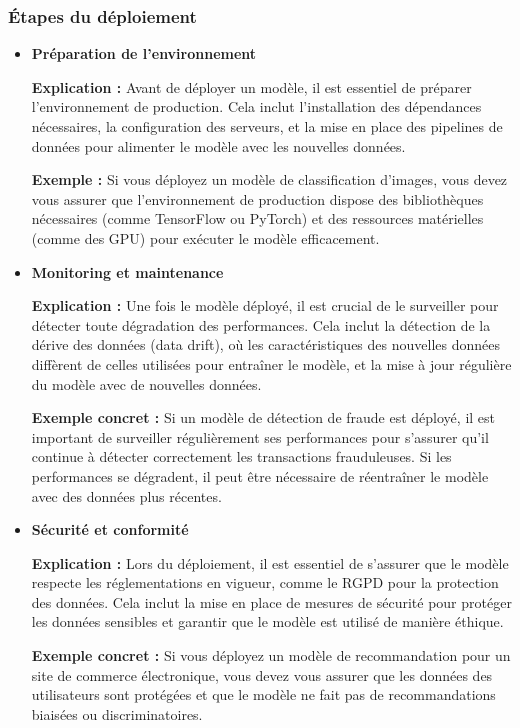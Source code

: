 \documentclass[10pt,a4paper]{article}
\begin{document}
\subsubsection*{Étapes du déploiement}

\begin{itemize}
    \item \textbf{Préparation de l'environnement}

    \textbf{Explication :}
    Avant de déployer un modèle, il est essentiel de préparer l'environnement de production. Cela inclut l'installation des dépendances nécessaires, la configuration des serveurs, et la mise en place des pipelines de données pour alimenter le modèle avec les nouvelles données.

    \textbf{Exemple :}
    Si vous déployez un modèle de classification d'images, vous devez vous assurer que l'environnement de production dispose des bibliothèques nécessaires (comme TensorFlow ou PyTorch) et des ressources matérielles (comme des GPU) pour exécuter le modèle efficacement.

    \item \textbf{Monitoring et maintenance}

    \textbf{Explication :}
    Une fois le modèle déployé, il est crucial de le surveiller pour détecter toute dégradation des performances. Cela inclut la détection de la dérive des données (data drift), où les caractéristiques des nouvelles données diffèrent de celles utilisées pour entraîner le modèle, et la mise à jour régulière du modèle avec de nouvelles données.

    \textbf{Exemple concret :}
    Si un modèle de détection de fraude est déployé, il est important de surveiller régulièrement ses performances pour s'assurer qu'il continue à détecter correctement les transactions frauduleuses. Si les performances se dégradent, il peut être nécessaire de réentraîner le modèle avec des données plus récentes.

    \item \textbf{Sécurité et conformité}

    \textbf{Explication :}
    Lors du déploiement, il est essentiel de s'assurer que le modèle respecte les réglementations en vigueur, comme le RGPD pour la protection des données. Cela inclut la mise en place de mesures de sécurité pour protéger les données sensibles et garantir que le modèle est utilisé de manière éthique.

    \textbf{Exemple concret :}
    Si vous déployez un modèle de recommandation pour un site de commerce électronique, vous devez vous assurer que les données des utilisateurs sont protégées et que le modèle ne fait pas de recommandations biaisées ou discriminatoires.
\end{itemize}
\end{document}
